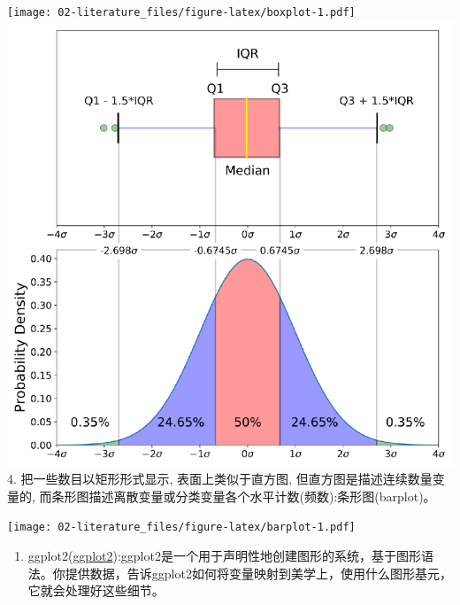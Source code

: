 \documentclass[
]{book}
\newenvironment{Shaded}{\begin{snugshade}}{\end{snugshade}}
\newcommand{\AttributeTok}[1]{\textcolor[rgb]{0.77,0.63,0.00}{#1}}
\newcommand{\CommentTok}[1]{\textcolor[rgb]{0.56,0.35,0.01}{\textit{#1}}}
\newcommand{\FunctionTok}[1]{\textcolor[rgb]{0.00,0.00,0.00}{#1}}
\newcommand{\NormalTok}[1]{#1}
\newcommand{\OtherTok}[1]{\textcolor[rgb]{0.56,0.35,0.01}{#1}}
\newcommand{\SpecialCharTok}[1]{\textcolor[rgb]{0.00,0.00,0.00}{#1}}
\newcommand{\StringTok}[1]{\textcolor[rgb]{0.31,0.60,0.02}{#1}}
\providecommand{\tightlist}{%
  \setlength{\itemsep}{0pt}\setlength{\parskip}{0pt}}
\begin{document}
\texttt{[image: 02-literature\_files/figure-latex/boxplot-1.pdf]}
\includegraphics{pics/boxplot.png}
4. 把一些数目以矩形形式显示, 表面上类似于直方图, 但直方图是描述连续数量变量的, 而条形图描述离散变量或分类变量各个水平计数(频数):条形图(barplot)。

\begin{Shaded}
\end{Shaded}

\texttt{[image: 02-literature\_files/figure-latex/barplot-1.pdf]}

\begin{enumerate}
\def\labelenumi{\arabic{enumi}.}
\setcounter{enumi}{4}
\tightlist
\item
  ggplot2(\href{https://ggplot2.tidyverse.org/index.html}{ggplot2}):ggplot2是一个用于声明性地创建图形的系统，基于图形语法。你提供数据，告诉ggplot2如何将变量映射到美学上，使用什么图形基元，它就会处理好这些细节。
\end{enumerate}
\end{document}
